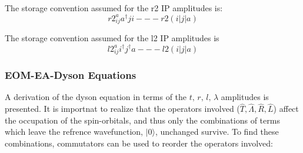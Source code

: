 The storage convention assumed for the r2 IP amplitudes is:
        \[ r2^{a}_{ij}{a^{\dagger} j i} --- r2(i|j|a) \]

The storage convention assumed for the l2 IP amplitudes is
           \[ l2^{a}_{ij}{i^{\dagger} j^{\dagger} a} --- l2(i|j|a)\]

\subsubsection{EOM-EA-Dyson Equations}
A derivation of the dyson equation in terms of the $t,\, r,\, l,\, \lambda$ amplitudes is presented.
It is importnat to realize that the operators involved ($\hat{T},\hat{\Lambda},\hat{R},\hat{L}$) affect the occupation of the spin-orbitals, and thus only the combinations of terms which leave the refrence wavefunction, $| 0 \rangle$, unchanged survive. To find these combinations, commutators can be used to reorder the operators involved:


